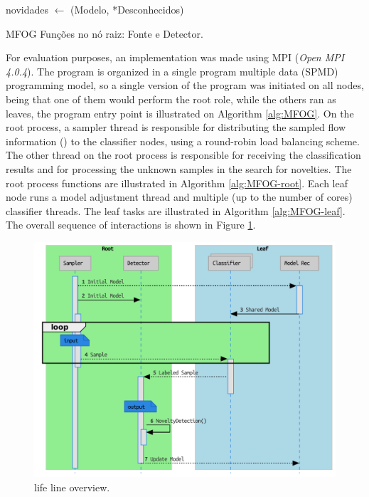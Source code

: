 \begin{algorithm}[htb]
{{{{                    novidades $\leftarrow$ \NoveltyDetection(Modelo, *Desconhecidos)\;
                }
            }
        }
    }
\caption{MFOG Funções no nó raiz: Fonte e Detector.}
\label{alg:MFOG-root}
\end{algorithm}

For evaluation purposes, an \mfog implementation was made using MPI (\emph{Open
MPI 4.0.4}).
The program is organized in a single program multiple data (SPMD)
programming model, so a single version of the \mfog program was initiated on all
nodes, being that one of them would perform the root role, while the others ran
as leaves, the program entry point is illustrated on Algorithm \ref{alg:MFOG}.
On the root process, a sampler thread is responsible for distributing the
sampled flow information (\val) to the classifier nodes, using a round-robin
load balancing scheme.
The other thread on the root process is responsible for receiving the
classification results and for processing the unknown samples in the search for
novelties.
The root process functions are illustrated in Algorithm \ref{alg:MFOG-root}.
Each leaf node runs a model adjustment thread and multiple (up to the number of
cores) classifier threads. The leaf tasks are illustrated in Algorithm
\ref{alg:MFOG-leaf}.
The overall sequence of interactions is shown in Figure \ref{fig:mfog-mpi-life}.

\begin{figure}[htb]
  \centerline{
    \includegraphics[width=0.75\linewidth,page=1]{figures/lifecycle-uml-svg.pdf}
  }
  \caption{\mfog life line overview.}
  \label{fig:mfog-mpi-life}
\end{figure}
